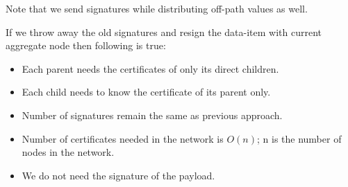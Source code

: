 	Note that we send signatures while distributing off-path values as well.

	If we throw away the old signatures and resign the data-item with current aggregate node then following is true:
		\begin{itemize}
			\item Each parent needs the certificates of only its direct children.
			\item Each child needs to know the certificate of its parent only.
			\item Number of signatures remain the same as previous approach.
			\item Number of certificates needed in the network is $O(n)$; n is the number of nodes in the network.
			\item We do not need the signature of the payload.
		\end{itemize}
